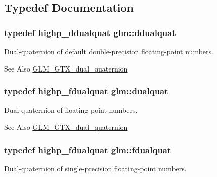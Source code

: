 \subsection{Typedef Documentation}
\hypertarget{group__gtx__dual__quaternion_ga373431ffdd82d5c03c258217a9e1f1a6}{
\subsubsection[{ddualquat}]{\setlength{\rightskip}{0pt plus 5cm}typedef highp\-\_\-ddualquat {\bf glm\-::ddualquat}}}\label{group__gtx__dual__quaternion_ga373431ffdd82d5c03c258217a9e1f1a6}
Dual-\/quaternion of default double-\/precision floating-\/point numbers.

\begin{DoxySeeAlso}{See Also}
\hyperlink{group__gtx__dual__quaternion}{G\-L\-M\-\_\-\-G\-T\-X\-\_\-dual\-\_\-quaternion} 
\end{DoxySeeAlso}
\hypertarget{group__gtx__dual__quaternion_ga2f6227b5f9dc08a2e7682065a84b3aa9}{
\subsubsection[{dualquat}]{\setlength{\rightskip}{0pt plus 5cm}typedef highp\-\_\-fdualquat {\bf glm\-::dualquat}}}\label{group__gtx__dual__quaternion_ga2f6227b5f9dc08a2e7682065a84b3aa9}
Dual-\/quaternion of floating-\/point numbers.

\begin{DoxySeeAlso}{See Also}
\hyperlink{group__gtx__dual__quaternion}{G\-L\-M\-\_\-\-G\-T\-X\-\_\-dual\-\_\-quaternion} 
\end{DoxySeeAlso}
\hypertarget{group__gtx__dual__quaternion_ga436906129bc69ca5059555cafcbac9fd}{
\subsubsection[{fdualquat}]{\setlength{\rightskip}{0pt plus 5cm}typedef highp\-\_\-fdualquat {\bf glm\-::fdualquat}}}\label{group__gtx__dual__quaternion_ga436906129bc69ca5059555cafcbac9fd}
Dual-\/quaternion of single-\/precision floating-\/point numbers.

